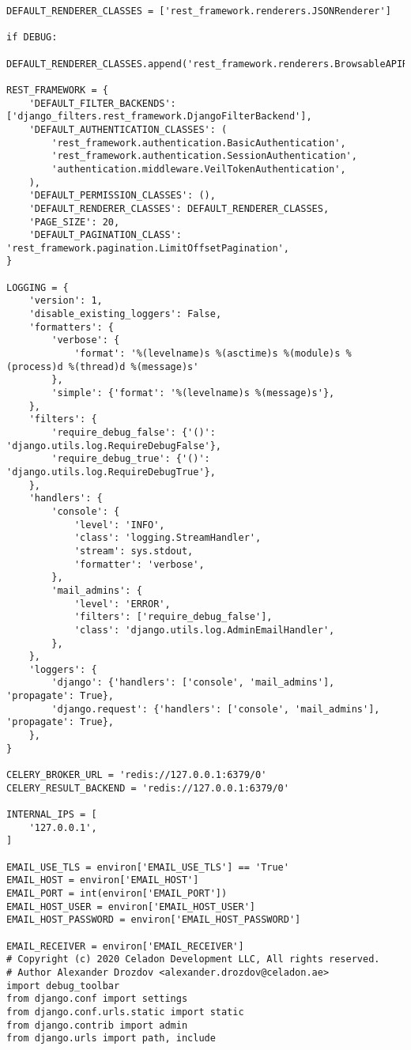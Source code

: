 \begin{lstlisting}
DEFAULT_RENDERER_CLASSES = ['rest_framework.renderers.JSONRenderer']

if DEBUG:
    DEFAULT_RENDERER_CLASSES.append('rest_framework.renderers.BrowsableAPIRenderer')

REST_FRAMEWORK = {
    'DEFAULT_FILTER_BACKENDS': ['django_filters.rest_framework.DjangoFilterBackend'],
    'DEFAULT_AUTHENTICATION_CLASSES': (
        'rest_framework.authentication.BasicAuthentication',
        'rest_framework.authentication.SessionAuthentication',
        'authentication.middleware.VeilTokenAuthentication',
    ),
    'DEFAULT_PERMISSION_CLASSES': (),
    'DEFAULT_RENDERER_CLASSES': DEFAULT_RENDERER_CLASSES,
    'PAGE_SIZE': 20,
    'DEFAULT_PAGINATION_CLASS': 'rest_framework.pagination.LimitOffsetPagination',
}

LOGGING = {
    'version': 1,
    'disable_existing_loggers': False,
    'formatters': {
        'verbose': {
            'format': '%(levelname)s %(asctime)s %(module)s %(process)d %(thread)d %(message)s'
        },
        'simple': {'format': '%(levelname)s %(message)s'},
    },
    'filters': {
        'require_debug_false': {'()': 'django.utils.log.RequireDebugFalse'},
        'require_debug_true': {'()': 'django.utils.log.RequireDebugTrue'},
    },
    'handlers': {
        'console': {
            'level': 'INFO',
            'class': 'logging.StreamHandler',
            'stream': sys.stdout,
            'formatter': 'verbose',
        },
        'mail_admins': {
            'level': 'ERROR',
            'filters': ['require_debug_false'],
            'class': 'django.utils.log.AdminEmailHandler',
        },
    },
    'loggers': {
        'django': {'handlers': ['console', 'mail_admins'], 'propagate': True},
        'django.request': {'handlers': ['console', 'mail_admins'], 'propagate': True},
    },
}

CELERY_BROKER_URL = 'redis://127.0.0.1:6379/0'
CELERY_RESULT_BACKEND = 'redis://127.0.0.1:6379/0'

INTERNAL_IPS = [
    '127.0.0.1',
]

EMAIL_USE_TLS = environ['EMAIL_USE_TLS'] == 'True'
EMAIL_HOST = environ['EMAIL_HOST']
EMAIL_PORT = int(environ['EMAIL_PORT'])
EMAIL_HOST_USER = environ['EMAIL_HOST_USER']
EMAIL_HOST_PASSWORD = environ['EMAIL_HOST_PASSWORD']

EMAIL_RECEIVER = environ['EMAIL_RECEIVER']
# Copyright (c) 2020 Celadon Development LLC, All rights reserved.
# Author Alexander Drozdov <alexander.drozdov@celadon.ae>
import debug_toolbar
from django.conf import settings
from django.conf.urls.static import static
from django.contrib import admin
from django.urls import path, include


\end{lstlisting}
